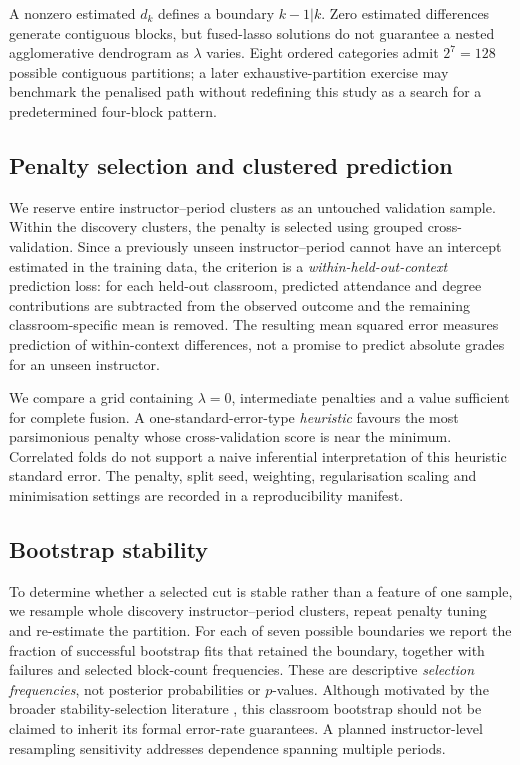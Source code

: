 \documentclass[11pt]{article}
\begin{document}
A nonzero estimated $d_k$ defines a boundary $k-1|k$. Zero estimated differences generate contiguous blocks, but fused-lasso solutions do not guarantee a nested agglomerative dendrogram as $\lambda$ varies. Eight ordered categories admit $2^7=128$ possible contiguous partitions; a later exhaustive-partition exercise may benchmark the penalised path without redefining this study as a search for a predetermined four-block pattern.

\subsection{Penalty selection and clustered prediction}
We reserve entire instructor--period clusters as an untouched validation sample. Within the discovery clusters, the penalty is selected using grouped cross-validation. Since a previously unseen instructor--period cannot have an intercept estimated in the training data, the criterion is a \emph{within-held-out-context} prediction loss: for each held-out classroom, predicted attendance and degree contributions are subtracted from the observed outcome and the remaining classroom-specific mean is removed. The resulting mean squared error measures prediction of within-context differences, not a promise to predict absolute grades for an unseen instructor.

We compare a grid containing $\lambda=0$, intermediate penalties and a value sufficient for complete fusion. A one-standard-error-type \emph{heuristic} favours the most parsimonious penalty whose cross-validation score is near the minimum. Correlated folds do not support a naive inferential interpretation of this heuristic standard error. The penalty, split seed, weighting, regularisation scaling and minimisation settings are recorded in a reproducibility manifest.

\subsection{Bootstrap stability}
To determine whether a selected cut is stable rather than a feature of one sample, we resample whole discovery instructor--period clusters, repeat penalty tuning and re-estimate the partition. For each of seven possible boundaries we report the fraction of successful bootstrap fits that retained the boundary, together with failures and selected block-count frequencies. These are descriptive \emph{selection frequencies}, not posterior probabilities or $p$-values. Although motivated by the broader stability-selection literature \citep{meinshausen2010stability}, this classroom bootstrap should not be claimed to inherit its formal error-rate guarantees. A planned instructor-level resampling sensitivity addresses dependence spanning multiple periods.
\end{document}
